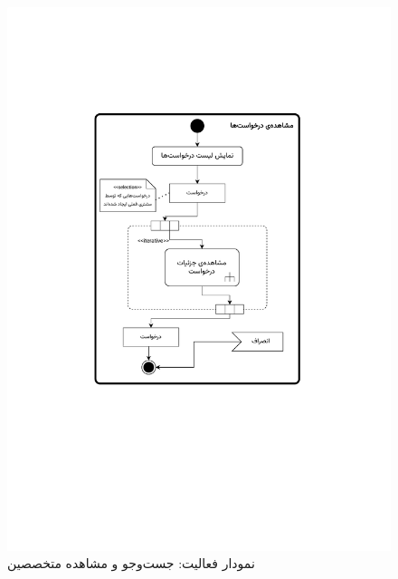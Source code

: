 \begin{figure}
	\centering
	\includegraphics[scale=0.8, page=8]{figs/OOD-activity11-20.pdf}
	\caption{نمودار فعالیت: جست‌وجو و مشاهده متخصصین}
\end{figure}
\FloatBarrier
\newpage


